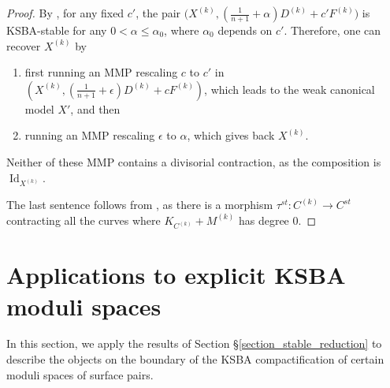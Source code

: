 \documentclass[a4paper,12pt]{amsart}
\DeclareMathOperator{\Spec}{Spec}
\DeclareMathOperator{\Id}{Id}
\theoremstyle{definition}
\theoremstyle{remark}
\begin{document}
\begin{proof} By , for any fixed $c'$, the pair $\big(X^{(k)},(\frac{1}{n+1}+\alpha)D^{(k)} + c'F^{(k)}\big)$ is KSBA-stable for any $0<\alpha\le \alpha_0$, where $\alpha_0$ depends on $c'$. Therefore, one can recover $X^{(k)}$ by 
\begin{enumerate}
    \item first running an MMP  rescaling $c$ to $c'$ in $(X^{(k)},(\frac{1}{n+1}+\epsilon)D^{(k)}+cF^{(k)})$, which leads to the weak canonical model $X'$, and then
    \item running an MMP rescaling $\epsilon$ to $\alpha$, which gives back $X^{(k)}$.
\end{enumerate}
 Neither of these MMP contains a divisorial contraction, as the composition is $\Id_{X^{(k)}}$.

 The last sentence follows from , as there is a morphism $\tau^{st}\colon C^{(k)}\to C^{st}$ contracting all the curves where $K_{C^{(k)}} + M^{(k)}$ has degree 0. 
\end{proof}





\section{Applications to explicit KSBA moduli spaces}\label{section_application_to_KSBA_moduli_when_epsilon_2_goes_to_0}

In this section, we apply the results of Section \S \ref{section_stable_reduction} to describe the objects on the boundary of the KSBA compactification of certain moduli spaces of surface pairs. 
\end{document}
